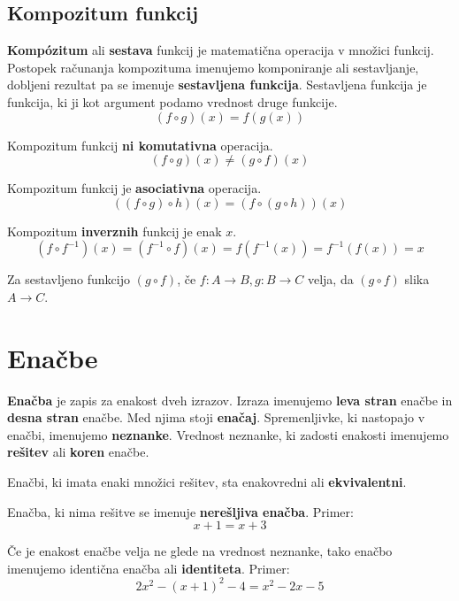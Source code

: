 \documentclass[a4paper,oneside,12pt,fleqn]{article}
\numberwithin{equation}{section}
\begin{document}
\subsection{Kompozitum funkcij}
\textbf{Komp\'{o}zitum} ali \textbf{sestava} funkcij je matematična operacija v množici funkcij.
Postopek računanja kompozituma imenujemo komponiranje ali sestavljanje, dobljeni rezultat
pa se imenuje \textbf{sestavljena funkcija}. Sestavljena funkcija je funkcija, ki ji kot argument podamo vrednost druge
funkcije.
\[ (f \circ g)(x) = f(g(x)) \]

Kompozitum funkcij \textbf{ni komutativna} operacija.
\[ (f \circ g)(x) \neq (g \circ f)(x) \]

Kompozitum funkcij je \textbf{asociativna} operacija.
\[ ( (f \circ g) \circ h)(x) = (f \circ (g \circ h))(x) \]

Kompozitum \textbf{inverznih} funkcij je enak $x$.
\[ (f \circ f^{-1})(x) = (f^{-1} \circ f)(x) = f(f^{-1}(x)) = f^{-1}(f(x)) = x \]

Za sestavljeno funkcijo $(g \circ f)$, če $f\colon A \rightarrow B, g\colon B \rightarrow C$ velja, da $(g
\circ f)$ slika $ A \rightarrow C$.

\section{Enačbe}
\label{sec:enac}
\textbf{Enačba} je zapis za enakost dveh izrazov. Izraza imenujemo \textbf{leva stran}
enačbe in \textbf{desna stran}
enačbe. Med njima stoji \textbf{enačaj}. Spremenljivke, ki nastopajo v enačbi, imenujemo
\textbf{neznanke}.
Vrednost neznanke, ki zadosti enakosti imenujemo \textbf{rešitev} ali \textbf{koren} enačbe.

Enačbi, ki imata enaki množici rešitev, sta enakovredni ali \textbf{ekvivalentni}.

Enačba, ki nima rešitve se imenuje \textbf{nerešljiva enačba}. Primer:
\[ x + 1 = x + 3 \]

Če je enakost enačbe velja ne glede na vrednost neznanke, tako enačbo imenujemo identična
enačba ali \textbf{identiteta}. Primer:
\[2x^2 -(x + 1)^2 - 4 = x^2 - 2x - 5 \]
\end{document}
